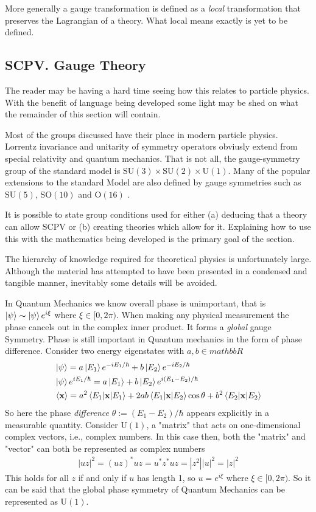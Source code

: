 \documentclass[twocolumn,floatfix,aps,prd,amsmath,amssymb]{revtex4}
\begin{document}
More generally a gauge transformation is defined as a \textit{local} transformation that preserves the Lagrangian of a theory. What local means exactly is yet to be defined.

\subsection{SCPV. Gauge Theory}

The reader may be having a hard time seeing how this relates to particle physics. With the benefit of language being developed some light may be shed on what the remainder of this section will contain.

Most of the groups discussed have their place in modern particle physics. Lorrentz invariance and unitarity of symmetry operators obviusly extend from special relativity and quantum mechanics. That is not all, the gauge-symmetry group of the standard model is $\mathrm{SU}(3)\times \mathrm{SU}(2)\times \mathrm{U}(1)$. Many of the popular extensions to the standard Model are also defined by gauge symmetries such as $\mathrm{SU}(5)$, $\mathrm{SO}(10)$ and $\mathrm{O}(16)$ \cite{SCPV4}.

It is possible to state group conditions used for either (a) deducing that a theory can allow SCPV or (b) creating theories which allow for it\cite{SCPVgroups}. Explaining how to use this with the mathematics being developed is the primary goal of the section.


The hierarchy of knowledge required for theoretical physics is unfortunately large. Although the material has attempted to have been presented in a condensed and tangible manner, inevitably some details will be avoided.

In Quantum Mechanics we know overall phase is unimportant, that is $\ket{\psi} \sim \ket{\psi}e^{i\xi}$ where $\xi \in [0,2\pi)$. When making any physical measurement the phase cancels out in the complex inner product. It forms a \textit{global} gauge Symmetry. Phase is still important in Quantum mechanics in the form of phase difference. Consider two energy eigenstates with $a,b\in mathbb{R}$
\begin{align*}
&\ket{\psi} = a\ket{E_1}e^{-iE_1/\hbar} +b \ket{E_2}e^{-iE_2/\hbar} \\
&\ket{\psi}e^{iE_1/\hbar} = a\ket{E_1} +b \ket{E_2}e^{i(E_1-E_2)/\hbar} \\
&\braket{\mathbf{x}} = a^2 \braket{E_1|\mathbf{x}|E_1} +2ab\braket{E_1 |\mathbf{x}|E_2}\cos \theta + b^2 \braket{E_2|\mathbf{x}|E_2}
\end{align*}
So here the phase \textit{difference} $\theta := (E_1-E_2)/\hbar$ appears explicitly in a measurable quantity. Consider $\mathrm{U}(1)$, a "matrix" that acts on one-dimensional complex vectors, i.e., complex numbers. In this case then, both the "matrix" and "vector" can both be represented as complex numbers 
\begin{align*}
|uz|^2=(uz)^* uz = u^*z^* uz = |z^2||u|^2 = |z|^2
\end{align*}
This holds for all $z$ if and only if $u$ has length 1, so $u = e^{i\xi}$ where $\xi \in [0,2\pi)$. So it can be said that the global phase symmetry of Quantum Mechanics can be represented as $\mathrm{U}(1)$. 
\end{document}
